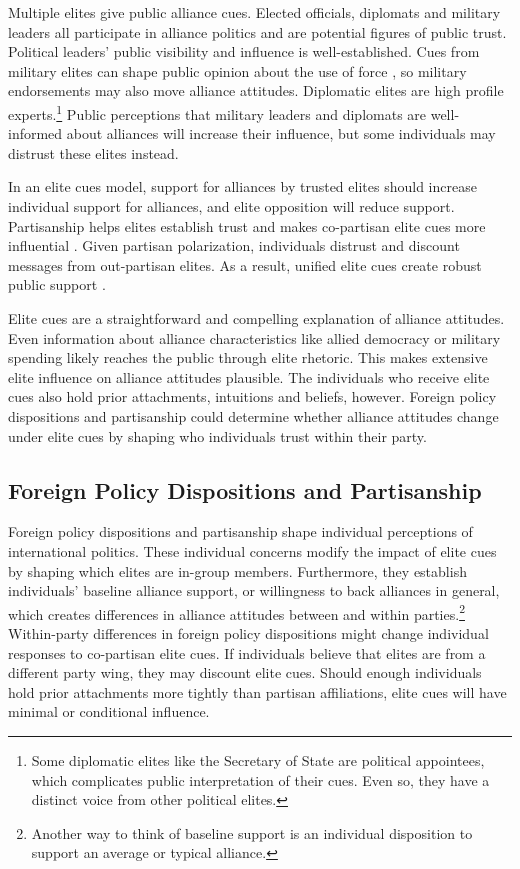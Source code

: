 \documentclass[12pt]{article}
\begin{document}
Multiple elites give public alliance cues.
Elected officials, diplomats and military leaders all participate in alliance politics and are potential figures of public trust.
Political leaders' public visibility and influence is well-established.
Cues from military elites can shape public opinion about the use of force \citep{Golbyetal2018}, so military endorsements may also move alliance attitudes. 
Diplomatic elites are high profile experts.\footnote{Some diplomatic elites like the Secretary of State are political appointees, which complicates public interpretation of their cues. Even so, they have a distinct voice from other political elites.}
Public perceptions that military leaders and diplomats are well-informed about alliances will increase their influence, but some individuals may distrust these elites instead.


In an elite cues model, support for alliances by trusted elites should increase individual support for alliances, and elite opposition will reduce support.   
Partisanship helps elites establish trust and makes co-partisan elite cues more influential \citep{Druckmanetal2013}.
Given partisan polarization, individuals distrust and discount messages from out-partisan elites.
As a result, unified elite cues create robust public support \citep{Berinsky2007}.


Elite cues are a straightforward and compelling explanation of alliance attitudes.
Even information about alliance characteristics like allied democracy or military spending likely reaches the public through elite rhetoric. 
This makes extensive elite influence on alliance attitudes plausible. 
The individuals who receive elite cues also hold prior attachments, intuitions and beliefs, however.
Foreign policy dispositions and partisanship could determine whether alliance attitudes change under elite cues by shaping who individuals trust within their party.


\subsection{Foreign Policy Dispositions and Partisanship}


Foreign policy dispositions and partisanship shape individual perceptions of international politics. 
These individual concerns modify the impact of elite cues by shaping which elites are in-group members.
Furthermore, they establish individuals' baseline alliance support, or willingness to back alliances in general, which creates differences in alliance attitudes between and within parties.\footnote{Another way to think of baseline support is an individual disposition to support an average or typical alliance.}
Within-party differences in foreign policy dispositions might change individual responses to co-partisan elite cues.
If individuals believe that elites are from a different party wing, they may discount elite cues.  
Should enough individuals hold prior attachments more tightly than partisan affiliations, elite cues will have minimal or conditional influence.
\end{document}
